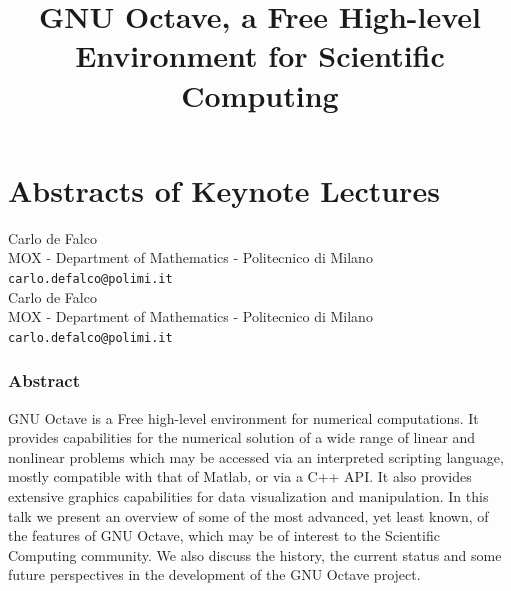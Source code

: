 \documentclass[article,A4,11pt]{llncs}%
\begin{document}
\newpage

\tableofcontents

\part{Abstracts of Keynote Lectures}

\title{GNU Octave, a Free High-level Environment for Scientific Computing}
 \author{} \institute{}
\maketitle
\begin{center}
{\large Carlo de Falco}\\
MOX - Department of Mathematics - Politecnico di Milano\\
{\tt carlo.defalco@polimi.it}
\\ \vspace{4mm}
{\large Carlo de Falco}\\
MOX - Department of Mathematics - Politecnico di Milano\\
{\tt carlo.defalco@polimi.it}
\end{center}

\section*{Abstract}
GNU Octave is a Free high-level environment for
 numerical computations. 
It provides capabilities for the numerical solution of a wide range of linear and 
nonlinear problems which may be accessed via an
 interpreted scripting language, mostly 
compatible with that of Matlab, or via a 
C++ API. 
It also provides extensive graphics capabilities for data visualization and manipulation. 
In this talk we present an overview of some of the most advanced, yet least known, of the features of GNU Octave, which may be of interest to the Scientific Computing community. 
We also discuss the history, the current status and some future perspectives in the development of the GNU Octave project.
\end{document}
